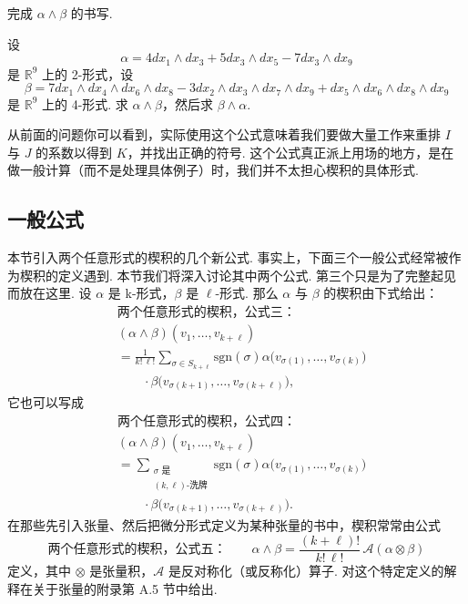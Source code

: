 \begin{question}\label{q:3-16}
完成 $\alpha\wedge\beta$ 的书写.
\end{question}

\begin{question}\label{q:3-17}
设
\[
\alpha=4dx_1\wedge dx_3+5dx_3\wedge dx_5-7dx_3\wedge dx_9
\]
是 $\mathbb{R}^9$ 上的 2-形式，设
\[
\beta=7dx_1\wedge dx_4\wedge dx_6\wedge dx_8-3dx_2\wedge dx_3\wedge dx_7\wedge dx_9+dx_5\wedge dx_6\wedge dx_8\wedge dx_9
\]
是 $\mathbb{R}^9$ 上的 4-形式. 求 $\alpha\wedge\beta$，然后求 $\beta\wedge\alpha$.
\end{question}

从前面的问题你可以看到，实际使用这个公式意味着我们要做大量工作来重排 $I$ 与 $J$ 的系数以得到 $K$，并找出正确的符号. 这个公式真正派上用场的地方，是在做一般计算（而不是处理具体例子）时，我们并不太担心楔积的具体形式.

\subsection{一般公式}

本节引入两个任意形式的楔积的几个新公式. 事实上，下面三个一般公式经常被作为楔积的定义遇到. 本节我们将深入讨论其中两个公式. 第三个只是为了完整起见而放在这里. 设 $\alpha$ 是 k-形式，$\beta$ 是 $\ell$-形式. 那么 $\alpha$ 与 $\beta$ 的楔积由下式给出：
\begin{align*}
&\text{两个任意形式的楔积，公式三：}\\
&(\alpha\wedge\beta)(v_1,\ldots,v_{k+\ell})\\
&=\frac{1}{k!\,\ell!}\sum_{\sigma\in S_{k+\ell}}\mathrm{sgn}(\sigma)\alpha\bigl(v_{\sigma(1)},\ldots,v_{\sigma(k)}\bigr)\\
&\qquad\cdot\beta\bigl(v_{\sigma(k+1)},\ldots,v_{\sigma(k+\ell)}\bigr),
\end{align*}
它也可以写成
\begin{align*}
&\text{两个任意形式的楔积，公式四：}\\
&(\alpha\wedge\beta)(v_1,\ldots,v_{k+\ell})\\
&=\sum_{\substack{\sigma\text{ 是}\\ (k,\ell)\text{-洗牌}}}\mathrm{sgn}(\sigma)\alpha\bigl(v_{\sigma(1)},\ldots,v_{\sigma(k)}\bigr)\\
&\qquad\cdot\beta\bigl(v_{\sigma(k+1)},\ldots,v_{\sigma(k+\ell)}\bigr).
\end{align*}
在那些先引入张量、然后把微分形式定义为某种张量的书中，楔积常常由公式
\[
\text{两个任意形式的楔积，公式五：}\qquad
\alpha\wedge\beta=\frac{(k+\ell)!}{k!\,\ell!}\,\mathcal{A}(\alpha\otimes\beta)
\]
定义，其中 $\otimes$ 是张量积，$\mathcal{A}$ 是反对称化（或反称化）算子. 对这个特定定义的解释在关于张量的附录第 A.5 节中给出.

